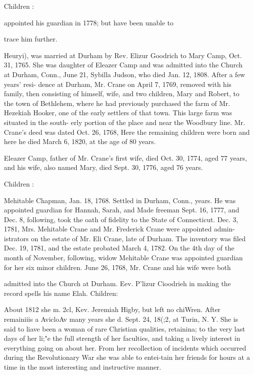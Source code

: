 \documentclass[oneside]{book}
\begin{document}
Children : 







appointed his guardian in 1778; but have been unable to 

trace him further. 

Heuryi), was married at Durham by Rev. Elizur Goodrich to 
Mary Camp, Oct. 31, 1765. She was daughter of Eleazer Camp 
and was admitted into the Church at Durham, Conn., June 21, 
Sybilla Judson, who died Jan. 12, 1808. After a few years' resi- 
dence at Durham, Mr. Crane on April 7, 1769, removed with his 
family, then consisting of himself, wife, and two children, Mary 
and Robert, to the town of Bethlehem, where he had previously 
purchased the farm of Mr. Hezekiah Hooker, one of the early 
settlers of that town. This large farm was situated in the south- 
erly portion of the place and near the Woodbury line. Mr. 
Crane's deed was dated Oct. 26, 1768, Here the remaining 
children were born and here he died March 6, 1820, at the age 
of 80 years. 

Eleazer Camp, father of Mr. Crane's first wife, died Oct. 30, 
1774, aged 77 years, and his wife, also named Mary, died Sept. 
30, 1776, aged 76 years. 

Children : 









Mehitable Chapman, Jan. 18, 1768. Settled in Durham, Conn., 
years. He was appointed guardian for Hannah, Sarah, and 
Made freeman Sept. 16, 1777, and Dec. 8, following, took the 
oath of fidelity to the State of Connecticut. Dec. 3, 1781, Mrs. 
Mehitable Crane and Mr. Frederick Crane were appointed admin- 
istrators on the estate of Mr. Eli Crane, late of Durham. The 
inventory was filed Dec. 19, 1781, and the estate probated March 
4, 1782. On the 4th day of the month of November, following, 
widow Mehitable Crane was appointed guardian for her six minor 
children. June 26, 1768, Mr. Crane and his wife were both 




admitted into the Church at Durham. Eev. P'lizur Cioodrieh in 
making the record spells his name Elah. Children: 

About 1812 she m. 2cl, Kev. Jeremiah Higby, but left no 
chiWren. After remainiiis a AvicloAv many years she d. Sept. 
24, 18(;2, at Turin, N. Y. She is said to liave been a woman 
of rare Christian qualities, retainina; to the very last days 
of her li;"e the full strength of her faculties, and taking a 
lively interest in everything going on about her. From 
her recollection of incidents which occurred during the 
Revolutionary War she was able to entei-tain her friends 
for hours at a time in the most interesting and instructive 
manner. 
\end{document}
